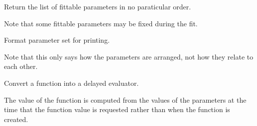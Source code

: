 \documentclass[letterpaper,10pt,english]{sphinxmanual}
\begin{document}

\begin{fulllineitems}
\label{api/mystic.parameter:refl1d.mystic.parameter.current}
\end{fulllineitems}


\begin{fulllineitems}
\label{api/mystic.parameter:refl1d.mystic.parameter.fittable}
Return the list of fittable parameters in no paraticular order.

Note that some fittable parameters may be fixed during the fit.

\end{fulllineitems}


\begin{fulllineitems}
\label{api/mystic.parameter:refl1d.mystic.parameter.flatten}
\end{fulllineitems}


\begin{fulllineitems}
\label{api/mystic.parameter:refl1d.mystic.parameter.format}
Format parameter set for printing.

Note that this only says how the parameters are arranged, not how they
relate to each other.

\end{fulllineitems}


\begin{fulllineitems}
\label{api/mystic.parameter:refl1d.mystic.parameter.function}
Convert a function into a delayed evaluator.

The value of the function is computed from the values of the parameters
at the time that the function value is requested rather than when the
function is created.

\end{fulllineitems}
\end{document}

